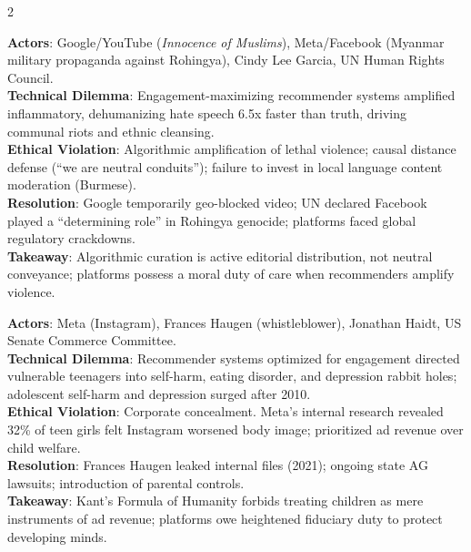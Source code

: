 \documentclass[9pt,a4paper]{extarticle}
\begin{document}
\begin{multicols}{2}
\begin{tcolorbox}[casebox,title={9. YouTube Inciting Violence / Myanmar (2012--2018)}]
\textbf{Actors}: Google/YouTube (\textit{Innocence of Muslims}), Meta/Facebook (Myanmar military propaganda against Rohingya), Cindy Lee Garcia, UN Human Rights Council.\\
\textbf{Technical Dilemma}: Engagement-maximizing recommender systems amplified inflammatory, dehumanizing hate speech 6.5x faster than truth, driving communal riots and ethnic cleansing.\\
\textbf{Ethical Violation}: Algorithmic amplification of lethal violence; causal distance defense (``we are neutral conduits''); failure to invest in local language content moderation (Burmese).\\
\textbf{Resolution}: Google temporarily geo-blocked video; UN declared Facebook played a ``determining role'' in Rohingya genocide; platforms faced global regulatory crackdowns.\\
\textbf{Takeaway}: Algorithmic curation is active editorial distribution, not neutral conveyance; platforms possess a moral duty of care when recommenders amplify violence.
\end{tcolorbox}

\begin{tcolorbox}[casebox,title={10. Social Media Adolescent Mental Health}]
\textbf{Actors}: Meta (Instagram), Frances Haugen (whistleblower), Jonathan Haidt, US Senate Commerce Committee.\\
\textbf{Technical Dilemma}: Recommender systems optimized for engagement directed vulnerable teenagers into self-harm, eating disorder, and depression rabbit holes; adolescent self-harm and depression surged after 2010.\\
\textbf{Ethical Violation}: Corporate concealment. Meta's internal research revealed 32\% of teen girls felt Instagram worsened body image; prioritized ad revenue over child welfare.\\
\textbf{Resolution}: Frances Haugen leaked internal files (2021); ongoing state AG lawsuits; introduction of parental controls.\\
\textbf{Takeaway}: Kant's Formula of Humanity forbids treating children as mere instruments of ad revenue; platforms owe heightened fiduciary duty to protect developing minds.
\end{tcolorbox}


\end{multicols}
\end{document}

